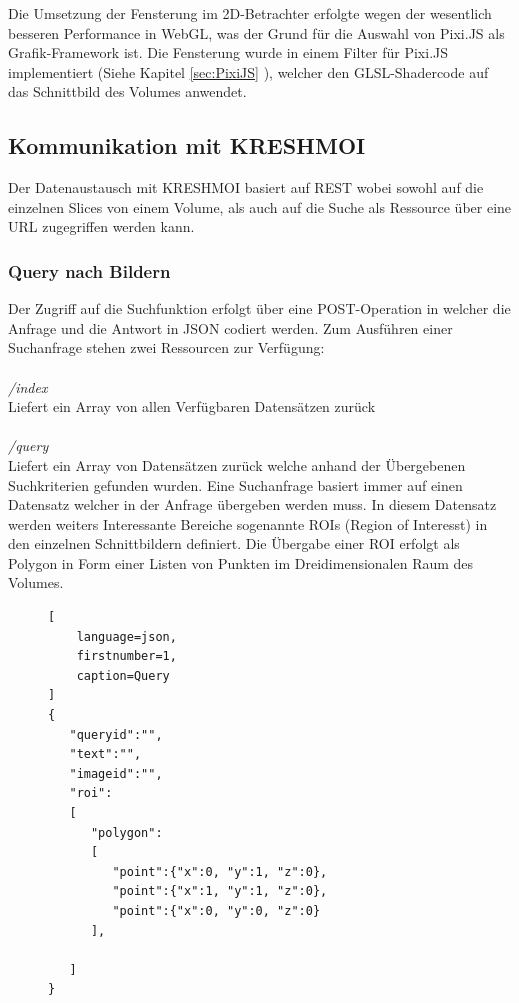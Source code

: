 Die Umsetzung der Fensterung im 2D-Betrachter erfolgte wegen der wesentlich besseren Performance in WebGL, 
was der Grund für die Auswahl von Pixi.JS als Grafik-Framework ist.
Die Fensterung wurde in einem Filter für Pixi.JS implementiert (Siehe Kapitel \ref{sec:PixiJS} ), welcher den GLSL-Shadercode auf das Schnittbild des Volumes anwendet.

\subsection{Kommunikation mit KRESHMOI}
\label{sec:Kommunikation mit KRESHMOI}
Der Datenaustausch mit KRESHMOI basiert auf REST wobei sowohl auf die einzelnen Slices von einem Volume, als auch auf die Suche als Ressource über eine URL zugegriffen werden kann.

\subsubsection{Query nach Bildern}
\label{sec:Query nach Bildern}
Der Zugriff auf die Suchfunktion erfolgt über eine POST-Operation in welcher die Anfrage und die Antwort in JSON codiert werden.
Zum Ausführen einer Suchanfrage stehen zwei Ressourcen zur Verfügung:
\\
\\
\textit{/index}\\
Liefert ein Array von allen Verfügbaren Datensätzen zurück 
\\
\\
\textit{/query}\\
Liefert ein Array von Datensätzen zurück welche anhand der Übergebenen Suchkriterien gefunden wurden.
Eine Suchanfrage basiert immer auf einen Datensatz welcher in der Anfrage übergeben werden muss.
In diesem Datensatz werden weiters Interessante Bereiche sogenannte ROIs (Region of Interesst) in den einzelnen Schnittbildern definiert.
Die Übergabe einer ROI erfolgt als Polygon in Form einer Listen von Punkten im Dreidimensionalen Raum des Volumes.
\begin{figure}[t]
\begin{lstlisting}[
	language=json,
	firstnumber=1,
	caption=Query
]
{
   "queryid":"",
   "text":"",
   "imageid":"",
   "roi": 
   [
      "polygon":
      [
         "point":{"x":0, "y":1, "z":0},
         "point":{"x":1, "y":1, "z":0},
         "point":{"x":0, "y":0, "z":0}
      ],

   ]
}
\end{lstlisting}
\end{figure}


